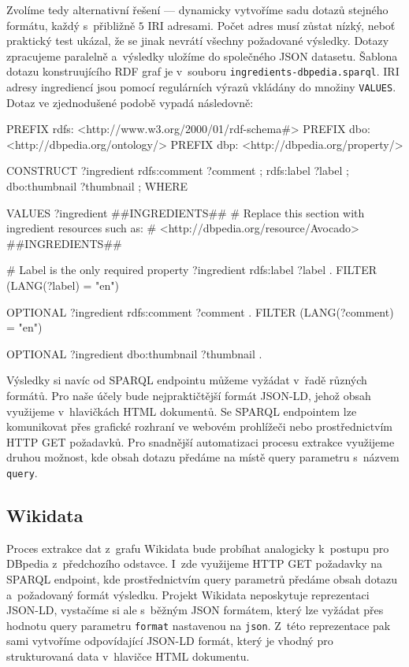 Zvolíme tedy alternativní řešení --- dynamicky vytvoříme sadu dotazů stejného formátu, každý s~přibližně $5$ IRI adresami. Počet adres musí zůstat nízký, neboť praktický test ukázal, že se jinak nevrátí všechny požadované výsledky. Dotazy zpracujeme paralelně a~výsledky uložíme do společného JSON datasetu. Šablona dotazu konstruujícího RDF graf je v~souboru \texttt{ingredients-dbpedia.sparql}. IRI adresy ingrediencí jsou pomocí regulárních výrazů vkládány do množiny \texttt{VALUES}. Dotaz ve zjednodušené podobě vypadá následovně:

\begin{code}
PREFIX rdfs: <http://www.w3.org/2000/01/rdf-schema#>
PREFIX dbo: <http://dbpedia.org/ontology/>
PREFIX dbp: <http://dbpedia.org/property/>

CONSTRUCT {
    ?ingredient rdfs:comment ?comment ;
                rdfs:label ?label ;
                dbo:thumbnail ?thumbnail ;
}
WHERE {
    VALUES ?ingredient { 
        ##INGREDIENTS## 
        # Replace this section with ingredient resources such as:
        # <http://dbpedia.org/resource/Avocado>
        ##INGREDIENTS##
    }

    # Label is the only required property
    ?ingredient rdfs:label ?label .
    FILTER (LANG(?label) = "en")
    
    OPTIONAL {
        ?ingredient rdfs:comment ?comment .
        FILTER (LANG(?comment) = "en")
    }

    OPTIONAL {?ingredient dbo:thumbnail ?thumbnail .}
}
\end{code}

Výsledky si navíc od SPARQL endpointu můžeme vyžádat v~řadě různých formátů. Pro naše účely bude nejpraktičtější formát JSON-LD, jehož obsah využijeme v~hlavičkách HTML dokumentů. Se SPARQL endpointem lze komunikovat přes grafické rozhraní ve webovém prohlížeči nebo prostřednictvím HTTP GET požadavků. Pro snadnější automatizaci procesu extrakce využijeme druhou možnost, kde obsah dotazu předáme na místě query parametru s~názvem \texttt{query}. 

\subsection{Wikidata}

Proces extrakce dat z~grafu Wikidata bude probíhat analogicky k~postupu pro DBpedia z~předchozího odstavce. I~zde využijeme HTTP GET požadavky na SPARQL endpoint, kde prostřednictvím query parametrů předáme obsah dotazu a~požadovaný formát výsledku. Projekt Wikidata neposkytuje reprezentaci JSON-LD, vystačíme si ale s~běžným JSON formátem, který lze vyžádat přes hodnotu query parametru \texttt{format} nastavenou na \texttt{json}. Z~této reprezentace pak sami vytvoříme odpovídající JSON-LD formát, který je vhodný pro strukturovaná data v~hlavičce HTML dokumentu.

